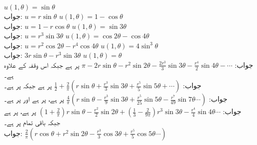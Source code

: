 \quad
$u(1,\theta)=\sin\theta$\\
جواب:\quad
$u=r\sin\theta$
\quad
$u(1,\theta)=1-\cos\theta$\\
جواب:\quad
$u=1-r\cos\theta$
\quad
$u(1,\theta)=\sin 3\theta$\\
جواب:\quad
$u=r^3\sin 3\theta$
\quad
$u(1,\theta)=\cos 2\theta-\cos 4\theta$\\
جواب:\quad
$u=r^2\cos 2\theta-r^4\cos 4\theta$
\quad
$u(1,\theta)=4\sin^3 \theta$\\
جواب:\quad
$3r\sin\theta-r^3\sin3\theta$
\quad
$u(1,\theta)=\theta$\\
جواب:\quad
$\pi-2r\sin\theta-r^2\sin 2\theta-\tfrac{2r^3}{3}\sin 3\theta-\tfrac{r^4}{2}\sin4\theta-\cdots$
\quad
{} پر  ہے جبکہ اس وقفہ کے علاوہ  ہے۔\\
جواب:\quad
$\tfrac{1}{2}+\tfrac{2}{\pi}(r\sin \theta+\tfrac{r^3}{3}\sin 3\theta+\tfrac{r^5}{5}\sin 5\theta+\cdots)$
\quad
{} پر  ہے جبکہ  پر 
 ہے۔\\
جواب:\quad
$\tfrac{4}{\pi}(r\sin\theta-\tfrac{r^3}{9}\sin 3\theta+\tfrac{r^5}{25}\sin5\theta-\tfrac{r^7}{49}\sin7\theta\cdots)$
\quad
{} پر  ہے،  پر 
 ہے اور  پر  ہے۔\\
جواب:\quad
$(1+\tfrac{2}{\pi})r\sin\theta-\tfrac{r^2}{2}\sin2\theta+(\tfrac{1}{3}-\tfrac{2}{9\pi})r^3\sin3\theta-\tfrac{r^4}{4}\sin4\theta\cdots$
\quad
{}  پر  ہے،  پر  ہے جبکہ باقی تمام  پر  ہے۔\\
جواب:\quad
$\tfrac{2}{\pi}(r\cos\theta+r^2\sin2\theta-\tfrac{r^3}{3}\cos3\theta+\tfrac{r^5}{5}\cos 5\theta\cdots )$
